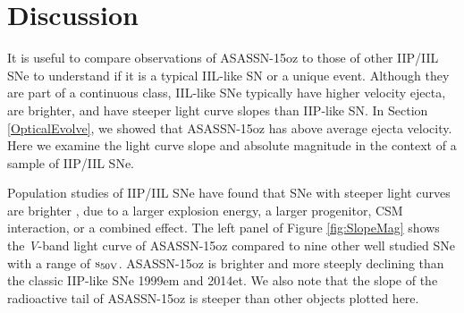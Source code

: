 \documentclass[a4paper,fleqn,usenatbib]{mnras}
\begin{document}
\section{Discussion} \label{SecComp}
It is useful to compare observations of ASASSN-15oz to those of other IIP/IIL SNe to understand if it is a typical IIL-like SN or a unique event.
Although they are part of a continuous class, IIL-like SNe typically have higher velocity ejecta, are brighter, and have steeper light curve slopes than IIP-like SN.
In Section \ref{OpticalEvolve}, we showed that ASASSN-15oz has above average ejecta velocity.
Here we examine the light curve slope and absolute magnitude in the context of a sample of IIP/IIL SNe.

Population studies of IIP/IIL SNe have found that SNe with steeper light curves are brighter \citep{2011li,2014anderson,2015sanders,2016valenti}, due to a larger explosion energy, a larger progenitor, CSM interaction, or a combined effect. 
The left panel of Figure \ref{fig:SlopeMag} shows the {\it V}-band light curve of ASASSN-15oz compared to nine other well studied SNe with a range of $\rm{s_{50V}}$.
ASASSN-15oz is brighter and more steeply declining than the classic IIP-like SNe 1999em and 2014et.
We also note that the slope of the radioactive tail of ASASSN-15oz is steeper than other objects plotted here.
\end{document}
